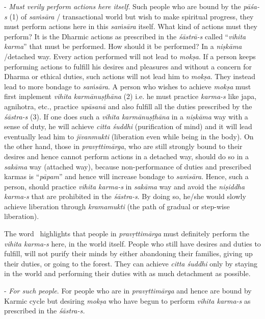 - \emph{Must verily perform actions here itself}. Such people who are bound by the \emph{pāśa-s} (1) of \emph{saṁsāra} / transactional world but wish to make spiritual progress, they must perform actions here in this \emph{saṁsāra} itself. What kind of actions must they perform? It is the Dharmic actions as prescribed in the \emph{śāstrā-s} called ``\emph{vihita karma}'' that must be performed. How should it be performed? In a \emph{niṣkāma} /detached way. Every action performed will not lead to \emph{mokṣa}. If a person keeps performing actions to fulfill his desires and pleasures and without a concern for Dharma or ethical duties, such actions will not lead him to \emph{mokṣa}. They instead lead to more bondage to \emph{saṁsāra}. A person who wishes to achieve \emph{mokṣa} must first implement \emph{vihita karmānuṣṭhāna} (2) i.e. he must practice \emph{karma-s} like japa, agnihotra, etc., practice \emph{upāsanā} and also fulfill all the duties prescribed by the \emph{śāstra-s} (3). If one does such a \emph{vihita karmānuṣṭhāna} in a \emph{niṣkāma} way with a sense of duty, he will achieve \emph{citta śuddhi} (purification of mind) and it will lead eventually lead him to \emph{jīvanmukti} (liberation even while being in the body). On the other hand, those in \emph{pravṛttimārga}, who are still strongly bound to their desires and hence cannot perform actions in a detached way, should do so in a \emph{sakāma} way (attached way), because non-performance of duties and prescribed karmas is ``\emph{pāpam}'' and hence will increase bondage to \emph{saṁsāra}. Hence, such a person, should practice \emph{vihita karma-s} in \emph{sakāma} way and avoid the \emph{niṣiddha karma-s} that are prohibited in the \emph{śāstra-s}. By doing so, he/she would slowly achieve liberation through \emph{kramamukti} (the path of gradual or step-wise liberation).

The word ~highlights that people in \emph{pravṛttimārga} must definitely perform the \emph{vihita karma-s} here, in the world itself. People who still have desires and duties to fulfill, will not purify their minds by either abandoning their families, giving up their duties, or going to the forest. They can achieve \emph{citta śuddhi} only by staying in the world and performing their duties with as much detachment as possible.

- \emph{For such people}. For people who are in \emph{pravṛttimārga} and hence are bound by Karmic cycle but desiring \emph{mokṣa} who have begun to perform \emph{vihita karma-s} as prescribed in the \emph{śāstra-s.}

